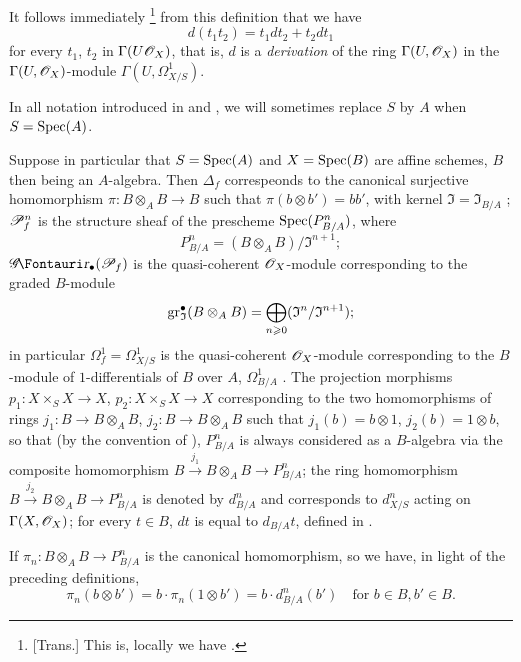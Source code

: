 It follows immediately
\footnote{
[Trans.] This is, locally we have .
}
from this definition that we have
\[
  \label{IV.16.3.6.1}
  d(t_1 t_2) = t_1 dt_2 + t_2 dt_1
  \tag{16.3.6.1} 
\]
for every $t_1$, $t_2$ in $\Gamma(U \mathscr{O}_X)$, that is, $d$ is a \emph{derivation} of the ring $\Gamma(U, \mathscr{O}_X)$ in the $\Gamma(U, \mathscr{O}_X)$-module $\Gamma(U, \Omega_{X/S}^1)$.

In all notation introduced in  and , we will sometimes replace $S$ by $A$ when $S = \operatorname{Spec}(A)$.

\begin{env}[16.3.7]
\label{IV.16.3.7}
Suppose in particular that $S = \operatorname{Spec}(A)$ and $X = \operatorname{Spec}(B)$ are affine schemes, $B$ then being an $A$-algebra.
Then $\Delta_f$ correspeonds to the canonical surjective homomorphism $\pi: B \otimes_A B \to B$ such that $\pi(b\otimes b') = bb'$, with kernel $\mathfrak{I} = \mathfrak{I}_{B/A}$ ;
$\mathscr{P}_{f}^n$ is the structure sheaf of the prescheme $\operatorname{Spec}(P_{B/A}^n)$, where
\[
  P_{B/A}^n = (B \otimes_A B)/\mathfrak{I}^{n+1};
\]
$\shGr_\bullet(\sh{P}_f)$ is the quasi-coherent $\mathscr{O}_X$-module corresponding to the graded $B$-module
\[
  \operatorname{gr}_\mathfrak{I}^\bullet(B \otimes_A B) = \bigoplus_{n \geqslant 0} (\mathfrak{I}^n/\mathfrak{I}^{n+1});
\]
in particular $\Omega_f^1 = \Omega_{X/S}^1$ is the quasi-coherent $\mathscr{O}_X$-module corresponding to the $B$-module of $1$-differentials of $B$ over $A$, $\Omega_{B/A}^1$ .
The projection morphisms $p_1: X \times_S X \to X$, $p_2: X \times_S X \to X$ corresponding to the two homomorphisms of rings $j_1: B \to B \otimes_A B$, $j_2: B \to B \otimes_A B$ such that $j_1(b) = b \otimes 1$, $j_2(b) = 1 \otimes b$, so that (by the convention of ), $P_{B/A}^n$ is always considered as a $B$-algebra via the composite homomorphism $B \xrightarrow{j_1} B \otimes_A B \to P_{B/A}^n$;
the ring homomorphism $B \xrightarrow{j_2} B \otimes_A B \to P_{B/A}^n$ is denoted by $d_{B/A}^n$ and corresponds to $d_{X/S}^n$ acting on $\Gamma(X, \mathscr{O}_X)$;
for every $t \in B$, $dt$ is equal to $d_{B/A}t$, defined in .

If $\pi_n: B \otimes_A B \to P_{B/A}^n$ is the canonical homomorphism, so we have, in light of the preceding definitions,
\[
  \label{IV.16.3.7.1}
  \pi_n(b\otimes b') = b \cdot \pi_n(1\otimes b') = b \cdot d_{B/A}^n(b') \quad \text{for } b \in B, b' \in B.
  \tag{16.3.7.1}
\]
\end{env}

